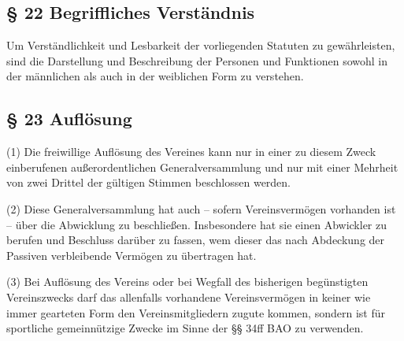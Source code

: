\documentclass[10pt,a4paper]{article}
\begin{document}
\subsection{§ 22
Begriffliches Verständnis}

Um Verständlichkeit und Lesbarkeit der vorliegenden Statuten zu gewährleisten, sind die Darstellung und Beschreibung der Personen und Funktionen sowohl in der männlichen als auch in der weiblichen Form zu verstehen.

\subsection{§ 23
Auflösung}

(1)
Die freiwillige Auflösung des Vereines kann nur in einer zu diesem Zweck einberufenen außerordentlichen Generalversammlung und nur mit einer Mehrheit von zwei Drittel der gültigen Stimmen beschlossen werden.

(2)
Diese Generalversammlung hat auch – sofern Vereinsvermögen vorhanden ist – über die Abwicklung zu beschließen.
Insbesondere hat sie einen Abwickler zu berufen und Beschluss darüber zu fassen, wem dieser das nach Abdeckung der Passiven verbleibende Vermögen zu übertragen hat.

(3)
Bei Auflösung des Vereins oder bei Wegfall des bisherigen begünstigten Vereinszwecks darf das allenfalls vorhandene Vereinsvermögen in keiner wie immer gearteten Form den Vereinsmitgliedern zugute kommen, sondern ist für sportliche gemeinnützige Zwecke im Sinne der §§ 34ff BAO zu verwenden.
\end{document}
